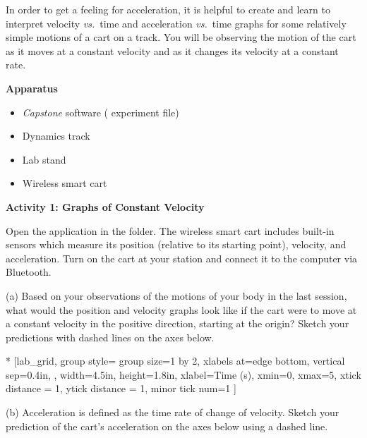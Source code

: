 In order to get a feeling for acceleration, it is helpful to create and learn
to interpret velocity \textit{vs.}~time and acceleration \textit{vs.}~time graphs for some relatively simple motions of a cart on a track. You will be observing the motion of the cart as it moves at a constant velocity and as it changes its velocity at a constant rate. 

\bigskip
\textbf{Apparatus} 
\vspace{-\parskip}
\begin{itemize} 
\item \textit{Capstone} software ( experiment file)
\item Dynamics track
\item Lab stand
\item Wireless smart cart  
\end{itemize}

\textbf{Activity 1: Graphs of Constant Velocity} 

Open the  application in the \filename{\coursefolder} folder.  The wireless smart cart includes built-in sensors which measure its position (relative to its starting point), velocity, and acceleration. Turn on the cart at your station and connect it to the computer via Bluetooth.

(a) Based on your observations of the motions of your body in the last session, what would the position and velocity graphs look like if the cart were to move at a constant velocity in the positive direction, starting at the origin? Sketch your predictions with dashed lines on the axes below.


\begin{lab_groupplot}*{}
					[lab_grid,
	group style={
		group size=1 by 2,
		xlabels at=edge bottom,
		vertical sep=0.4in,
		},
	width=4.5in, height=1.8in,
	xlabel=Time (s),
	xmin=0, xmax=5,
	xtick distance = 1, 
	ytick distance = 1, 
	minor tick num=1
	]
\nextgroupplot[
	ymin=0,ymax=2, 
	ylabel={Position (m)},
	ylabel_align={-1},
	]
\nextgroupplot[
	ymin=-1,ymax=1, 
	ylabel={Velocity (m/s)},
	]
\end{lab_groupplot}

(b) Acceleration is defined as the time rate of change of velocity. Sketch your
prediction of the cart's acceleration on the axes below using a dashed line.

